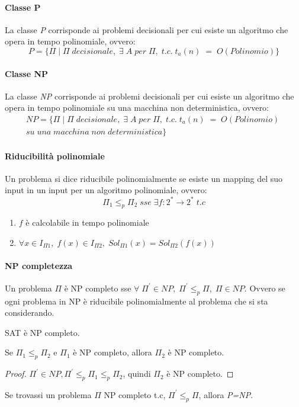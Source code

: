 \paragraph{Classe P}
La classe \emph{P} corrisponde ai problemi decisionali 
per cui esiste un algoritmo che opera
in tempo polinomiale, ovvero: 
$$P = \{\Pi\;|\;\Pi\;decisionale, \; \exists\;A\;per\;\Pi,\;t.c.\;t_a(n)\;=\;O(Polinomio)\}$$

\paragraph{Classe NP}
La classe \emph{NP} corrisponde ai problemi decisionali 
per cui esiste un algoritmo che opera
in tempo polinomiale su una macchina non deterministica, ovvero: 
\begin{equation}
    \begin{aligned}
        \mathit{NP} = \{\Pi\;|\;\Pi\;decisionale, \; \exists\;A\;per\;\Pi,\; t.c.\;t_a(n)\;=\;O(Polinomio)\;
        \\su\;una\;macchina\;non\;deterministica\}
    \end{aligned}
\end{equation}

\paragraph{Riducibilità polinomiale}
Un problema si dice riducibile polinomialmente se esiste un mapping del suo 
input in un input per un algoritmo polinomiale, ovvero:
$$\Pi_1 \leqslant _p \Pi_2 \;sse\; \exists f : 2^* \rightarrow 2^*\; t.c$$
\begin{enumerate}
    \item $f$ è calcolabile in tempo polinomiale
    \item $\forall x \in I_{\Pi1},\;f(x) \in I_{\Pi2},\; Sol_{\Pi1}(x) = Sol_{\Pi2}(f(x))$ 
\end{enumerate}

\paragraph{NP completezza}
Un problema $\Pi$ è NP completo sse $\forall\;\Pi^\prime \in NP,\; \Pi^\prime \leqslant _p \Pi, \; \Pi \in NP$.
Ovvero se ogni problema in NP è riducibile polinomialmente al problema che si sta 
considerando.

\begin{theorem}
    SAT è NP completo.
\end{theorem}
\begin{corollary}
    Se $\Pi_1 \leqslant _p \Pi_2$ e $\Pi_1$ è NP completo, allora $\Pi_2$ è NP completo.
\end{corollary}
\begin{proof}
    $\Pi^\prime \in NP, \Pi^\prime \leqslant _p \Pi_1 \leqslant _p \Pi_2$, quindi $\Pi_2$ è NP completo.
\end{proof}
\begin{remark}
    Se trovassi un problema $\Pi$ NP completo t.c, $\Pi^\prime \leqslant _p \Pi$, 
    allora \emph{P=NP}.
\end{remark}

